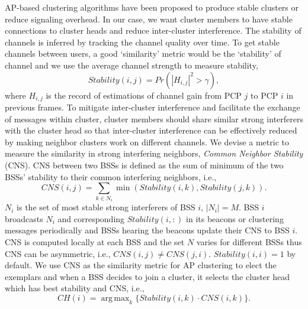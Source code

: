 \documentclass[10pt, conference, letterpaper]{IEEEtran}
\DeclareMathOperator*{\argmax}{arg\,max}
\begin{document}
AP-based clustering algorithms have been proposed to produce stable clusters \cite{apvanet} or reduce signaling overhead\cite{apd2d}. In our case, we want cluster members to have stable connections to cluster heads and reduce inter-cluster interference. The stability of channels is inferred by tracking the channel quality over time. To get stable channels between users, a good `similarity' metric would be the `stability' of channel and we use the average channel strength to measure stability,
$$Stability(i,j)=Pr(|H_{i,j}|^2>\gamma),$$ 
where $H_{i,j}$ is the record of estimations of channel gain from PCP $j$ to PCP $i$ in previous frames. To mitigate inter-cluster interference and facilitate the exchange of messages within cluster, cluster members should share similar strong interferers with the cluster head so that inter-cluster interference can be effectively reduced by making neighbor clusters work on different channels. We devise a metric to measure the similarity in strong interfering neighbors, \emph{Common Neighbor Stability} (CNS). CNS between two BSSs is defined as the sum of minimum of the two BSSs' stability to their common interfering neighbors, i.e.,
\begin{equation}\label{eq:CNS}
CNS(i,j) = \sum_{k\in N_i}{\min(Stability(i,k), Stability(j,k))}.
\end{equation}
$N_i$ is the set of most stable strong interferers of BSS $i$, $|N_i| = M$. BSS $i$ broadcasts $N_i$ and corresponding $Stability(i,:)$ in its beacons or clustering messages periodically and BSSs hearing the beacons update their CNS to BSS $i$. CNS is computed locally at each BSS and the set $N$ varies for different BSSs thus CNS can be asymmetric, i.e., $CNS(i,j)\neq CNS(j,i)$.
$Stability(i,i) = 1$ by default. We use CNS as the similarity metric for AP clustering to elect the exemplars and when a BSS decides to join a cluster, it selects the cluster head which has best stability and CNS, i.e.,
$$CH(i) = \argmax_k \{Stability(i,k)\cdot CNS(i,k)\}.$$

\end{document}

